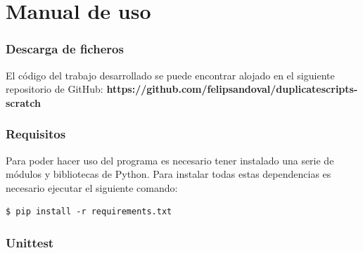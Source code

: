 \documentclass[a4paper, 12pt]{book}
\begin{document}
\cleardoublepage





\cleardoublepage
\appendix

\chapter{Manual de uso}
\label{app:manual}


\subsection{Descarga de ficheros}
El código del trabajo desarrollado se puede encontrar alojado en el siguiente repositorio de GitHub: \textbf{https://github.com/felipsandoval/duplicatescripts-scratch}

\subsection{Requisitos}

Para poder hacer uso del programa es necesario tener instalado una serie de módulos y bibliotecas de Python. Para instalar todas estas dependencias es necesario ejecutar el siguiente comando:

\begin{lstlisting}[style=consola,numbers=none]
$ pip install -r requirements.txt
\end{lstlisting}

\subsection{Unittest}
\end{document}
